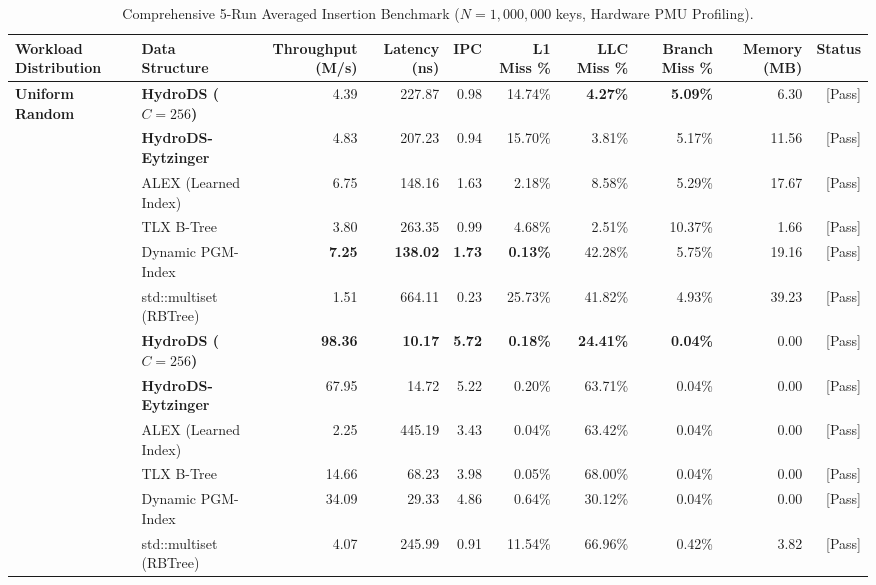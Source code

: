 \documentclass[10pt,twocolumn,letterpaper]{article}
\theoremstyle{definition}
\begin{document}
\begin{table}[t]
\centering
\caption{Comprehensive 5-Run Averaged Insertion Benchmark ($N{=}1{,}000{,}000$ keys, Hardware PMU Profiling).}
\label{tab:insert_results}
\scriptsize\setlength{\tabcolsep}{3.5pt}
\renewcommand{\arraystretch}{1.08}
\begin{tabular}{@{}llrrrrrrrr@{}}
\toprule
\textbf{Workload Distribution} & \textbf{Data Structure} & \textbf{Throughput (M/s)} & \textbf{Latency (ns)} & \textbf{IPC} & \textbf{L1 Miss \%} & \textbf{LLC Miss \%} & \textbf{Branch Miss \%} & \textbf{Memory (MB)} & \textbf{Status}\\
\midrule
\multirow{6}{*}{\textbf{Uniform Random}}
  & \textbf{HydroDS ($C{=}256$)}   & 4.39 & 227.87 & 0.98 & 14.74\% & \textbf{4.27\%} & \textbf{5.09\%} & 6.30 & [Pass]\\
  & \textbf{HydroDS-Eytzinger}     & 4.83 & 207.23 & 0.94 & 15.70\% & 3.81\% & 5.17\% & 11.56 & [Pass]\\
  & ALEX (Learned Index)          & 6.75 & 148.16 & 1.63 & 2.18\% & 8.58\% & 5.29\% & 17.67 & [Pass]\\
  & TLX B-Tree                    & 3.80 & 263.35 & 0.99 & 4.68\% & 2.51\% & 10.37\% & 1.66 & [Pass]\\
  & Dynamic PGM-Index             & \textbf{7.25} & \textbf{138.02} & \textbf{1.73} & \textbf{0.13\%} & 42.28\% & 5.75\% & 19.16 & [Pass]\\
  & std::multiset (RBTree)        & 1.51 & 664.11 & 0.23 & 25.73\% & 41.82\% & 4.93\% & 39.23 & [Pass]\\
\midrule
\rowcolor{rowgray}
\multirow{6}{*}{\textbf{Sequential (Ascending)}}
  & \textbf{HydroDS ($C{=}256$)}   & \textbf{98.36} & \textbf{10.17} & \textbf{5.72} & \textbf{0.18\%} & \textbf{24.41\%} & \textbf{0.04\%} & 0.00 & [Pass]\\
\rowcolor{rowgray}
  & \textbf{HydroDS-Eytzinger}     & 67.95 & 14.72 & 5.22 & 0.20\% & 63.71\% & 0.04\% & 0.00 & [Pass]\\
\rowcolor{rowgray}
  & ALEX (Learned Index)          & 2.25 & 445.19 & 3.43 & 0.04\% & 63.42\% & 0.04\% & 0.00 & [Pass]\\
\rowcolor{rowgray}
  & TLX B-Tree                    & 14.66 & 68.23 & 3.98 & 0.05\% & 68.00\% & 0.04\% & 0.00 & [Pass]\\
\rowcolor{rowgray}
  & Dynamic PGM-Index             & 34.09 & 29.33 & 4.86 & 0.64\% & 30.12\% & 0.04\% & 0.00 & [Pass]\\
\rowcolor{rowgray}
  & std::multiset (RBTree)        & 4.07 & 245.99 & 0.91 & 11.54\% & 66.96\% & 0.42\% & 3.82 & [Pass]\\

\end{tabular}
\end{table}
\end{document}
